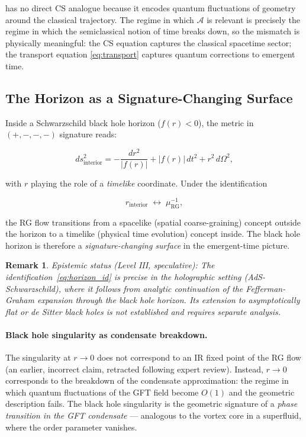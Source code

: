 \documentclass[12pt,a4paper]{article}
\newtheorem{remark}{Remark}
\begin{document}
has no direct CS analogue because it encodes quantum fluctuations of
geometry around the classical trajectory.
The regime in which $\mathcal{A}$ is relevant is precisely the regime
in which the semiclassical notion of time breaks down, so the mismatch
is physically meaningful: the CS equation captures the classical
spacetime sector; the transport equation \eqref{eq:transport} captures
quantum corrections to emergent time.

\subsection{The Horizon as a Signature-Changing Surface}
\label{sec:horizon}

Inside a Schwarzschild black hole horizon ($f(r) < 0$), the metric in
$(+,-,-,-)$ signature reads:

\begin{equation}
\label{eq:interior_metric}
ds^2_{\text{interior}}
= -\frac{dr^2}{|f(r)|} + |f(r)|\,dt^2 + r^2\,d\Omega^2,
\end{equation}

with $r$ playing the role of a \emph{timelike} coordinate.
Under the identification

\begin{equation}
\label{eq:horizon_id}
r_{\text{interior}} \;\longleftrightarrow\; \mu^{-1}_{\mathrm{RG}},
\end{equation}

the RG flow transitions from a spacelike (spatial coarse-graining)
concept outside the horizon to a timelike (physical time evolution)
concept inside.
The black hole horizon is therefore a \emph{signature-changing surface}
in the emergent-time picture.

\begin{remark}
\emph{Epistemic status (Level III, speculative):}
The identification~\eqref{eq:horizon_id} is precise in the holographic
setting (AdS-Schwarzschild), where it follows from analytic continuation
of the Fefferman-Graham expansion through the black hole horizon.
Its extension to asymptotically flat or de Sitter black holes is not
established and requires separate analysis.
\end{remark}

\paragraph{Black hole singularity as condensate breakdown.}
The singularity at $r\to 0$ does not correspond to an IR fixed point of
the RG flow (an earlier, incorrect claim, retracted following expert
review).
Instead, $r\to 0$ corresponds to the breakdown of the condensate
approximation: the regime in which quantum fluctuations of the GFT
field become $O(1)$ and the geometric description fails.
The black hole singularity is the geometric signature of a
\emph{phase transition in the GFT condensate} — analogous to the vortex
core in a superfluid, where the order parameter vanishes.
\end{document}
